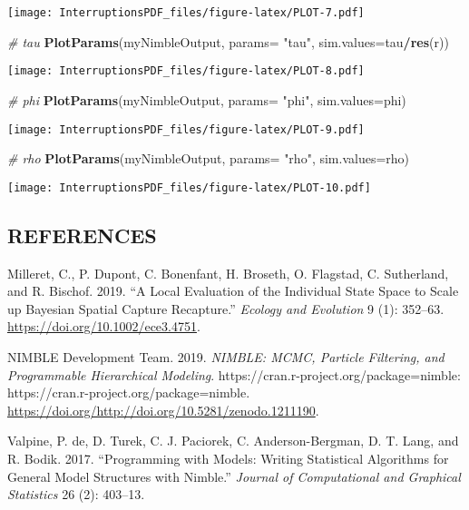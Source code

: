 \documentclass[
]{article}
\newenvironment{Shaded}{\begin{snugshade}}{\end{snugshade}}
\newcommand{\CommentTok}[1]{\textcolor[rgb]{0.56,0.35,0.01}{\textit{#1}}}
\newcommand{\DataTypeTok}[1]{\textcolor[rgb]{0.13,0.29,0.53}{#1}}
\newcommand{\KeywordTok}[1]{\textcolor[rgb]{0.13,0.29,0.53}{\textbf{#1}}}
\newcommand{\NormalTok}[1]{#1}
\newcommand{\OperatorTok}[1]{\textcolor[rgb]{0.81,0.36,0.00}{\textbf{#1}}}
\newcommand{\StringTok}[1]{\textcolor[rgb]{0.31,0.60,0.02}{#1}}
\begin{document}
\texttt{[image: InterruptionsPDF\_files/figure-latex/PLOT-7.pdf]}

\begin{Shaded}
\begin{Highlighting}[]
\CommentTok{# tau}
\KeywordTok{PlotParams}\NormalTok{(myNimbleOutput, }\DataTypeTok{params=} \StringTok{"tau"}\NormalTok{, }\DataTypeTok{sim.values=}\NormalTok{tau}\OperatorTok{/}\KeywordTok{res}\NormalTok{(r))}
\end{Highlighting}
\end{Shaded}

\texttt{[image: InterruptionsPDF\_files/figure-latex/PLOT-8.pdf]}

\begin{Shaded}
\begin{Highlighting}[]
\CommentTok{# phi}
\KeywordTok{PlotParams}\NormalTok{(myNimbleOutput, }\DataTypeTok{params=} \StringTok{"phi"}\NormalTok{, }\DataTypeTok{sim.values=}\NormalTok{phi)}
\end{Highlighting}
\end{Shaded}

\texttt{[image: InterruptionsPDF\_files/figure-latex/PLOT-9.pdf]}

\begin{Shaded}
\begin{Highlighting}[]
\CommentTok{# rho}
\KeywordTok{PlotParams}\NormalTok{(myNimbleOutput, }\DataTypeTok{params=} \StringTok{"rho"}\NormalTok{, }\DataTypeTok{sim.values=}\NormalTok{rho)}
\end{Highlighting}
\end{Shaded}

\texttt{[image: InterruptionsPDF\_files/figure-latex/PLOT-10.pdf]}

\hypertarget{references}{%
\subsection*{REFERENCES}\label{references}}

\hypertarget{refs}{}
\leavevmode\hypertarget{ref-Milleret2019}{}%
Milleret, C., P. Dupont, C. Bonenfant, H. Broseth, O. Flagstad, C.
Sutherland, and R. Bischof. 2019. ``A Local Evaluation of the Individual
State Space to Scale up Bayesian Spatial Capture Recapture.''
\emph{Ecology and Evolution} 9 (1): 352--63.
\url{https://doi.org/10.1002/ece3.4751}.

\leavevmode\hypertarget{ref-NIMBLE}{}%
NIMBLE Development Team. 2019. \emph{NIMBLE: MCMC, Particle Filtering,
and Programmable Hierarchical Modeling}.
https://cran.r-project.org/package=nimble:
https://cran.r-project.org/package=nimble.
\url{https://doi.org/http://doi.org/10.5281/zenodo.1211190}.

\leavevmode\hypertarget{ref-deValpine2017}{}%
Valpine, P. de, D. Turek, C. J. Paciorek, C. Anderson-Bergman, D. T.
Lang, and R. Bodik. 2017. ``Programming with Models: Writing Statistical
Algorithms for General Model Structures with Nimble.'' \emph{Journal of
Computational and Graphical Statistics} 26 (2): 403--13.
\end{document}
